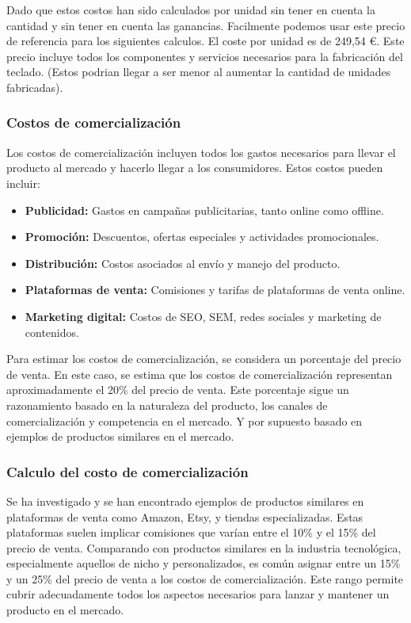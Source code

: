 Dado que estos costos han sido calculados por unidad sin tener en cuenta la cantidad y sin tener en cuenta las ganancias. Facilmente podemos usar este precio de referencia para los siguientes calculos. El coste por unidad es de 249,54 \euro. Este precio incluye todos los componentes y servicios necesarios para la fabricación del teclado. (Estos podrian llegar a ser menor al aumentar la cantidad de unidades fabricadas).

\subsubsection{Costos de comercialización}

Los costos de comercialización incluyen todos los gastos necesarios para llevar el producto al mercado y hacerlo llegar a los consumidores. Estos costos pueden incluir:

\begin{itemize}
    \item \textbf{Publicidad:} Gastos en campañas publicitarias, tanto online como offline.
    \item \textbf{Promoción:} Descuentos, ofertas especiales y actividades promocionales.
    \item \textbf{Distribución:} Costos asociados al envío y manejo del producto.
    \item \textbf{Plataformas de venta:} Comisiones y tarifas de plataformas de venta online.
    \item \textbf{Marketing digital:} Costos de SEO, SEM, redes sociales y marketing de contenidos.
\end{itemize}

Para estimar los costos de comercialización, se considera un porcentaje del precio de venta. En este caso, se estima que los costos de comercialización representan aproximadamente el 20\% del precio de venta. Este porcentaje sigue un razonamiento basado en la naturaleza del producto, los canales de comercialización y competencia en el mercado. Y por supuesto basado en ejemplos de productos similares en el mercado.

\subsubsection{Calculo del costo de comercialización}
Se ha investigado y se han encontrado ejemplos de productos similares en plataformas de venta como Amazon, Etsy, y tiendas especializadas. Estas plataformas suelen implicar comisiones que varían entre el 10\% y el 15\% del precio de venta. Comparando con productos similares en la industria tecnológica, especialmente aquellos de nicho y personalizados, es común asignar entre un 15\% y un 25\% del precio de venta a los costos de comercialización. Este rango permite cubrir adecuadamente todos los aspectos necesarios para lanzar y mantener un producto en el mercado.

